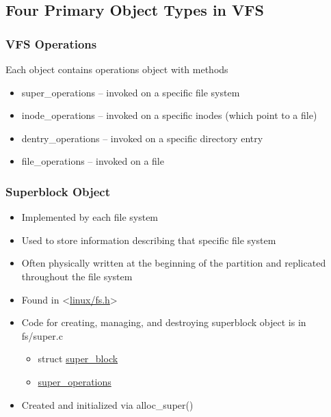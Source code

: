 \subsection{Four Primary Object Types in VFS}

% 
\begin{frame}[fragile]
    \frametitle{VFS Operations}

% 
Each object contains operations object with methods

    \begin{itemize}
        \item super\_operations -- invoked on a specific  file system
        \item inode\_operations -- invoked on a specific inodes (which point to a file)
        \item dentry\_operations -- invoked on a specific directory entry
        \item file\_operations -- invoked on a file 
    \end{itemize}
% 
\end{frame}
\begin{frame}[fragile]
    \frametitle{Superblock Object}


    \begin{itemize}
        \item Implemented by each file system
        \item Used to store information describing that specific file system
        \item Often physically written at the beginning of the partition and replicated throughout the file system
        \item Found in <\href{https://elixir.bootlin.com/linux/latest/source/include/linux/fs.h\#L1414}{linux/fs.h}>
        \item Code for creating, managing, and destroying superblock object is in fs/super.c
	    \begin{itemize}
	        \item struct \href{https://elixir.bootlin.com/linux/latest/source/include/linux/fs.h\#L1465}{super\_block}
	    \end{itemize}
	    \begin{itemize}
	        \item \href{https://elixir.bootlin.com/linux/v4.18.16/source/include/linux/fs.h\#L1824}{super\_operations}
      \end{itemize}
        \item Created and initialized via alloc\_super()
    \end{itemize}
% 
\end{frame}

